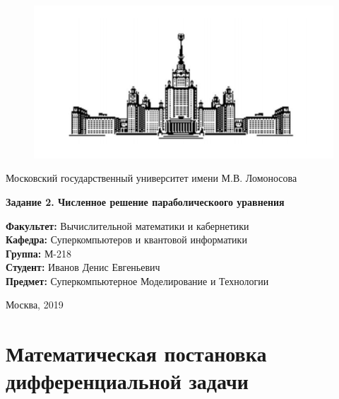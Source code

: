 \documentclass[12pt,a4paper]{scrartcl}
\begin{document}
\begin{titlepage}

    \begin{figure}[h]
        \centering
        \includegraphics[scale=0.5]{gzlogo_new.png}
    \end{figure}

    \begin{center}
        \large
        Московский государственный университет имени М.В. Ломоносова

        \vfill

        \LARGE
        \textbf{Задание 2. Численное решение параболическоого уравнения}

        \vfill

        \hfill\begin{minipage}{0.6\textwidth}
            \normalsize
            \textbf{Факультет:} Вычислительной математики и кабернетики \\
            \textbf{Кафедра:} Суперкомпьютеров и квантовой информатики \\
            \textbf{Группа:} М-218 \\
            \textbf{Студент:} Иванов Денис Евгеньевич \\
            \textbf{Предмет:} Суперкомпьютерное Моделирование и Технологии \\
        \end{minipage}
        \vfill
        

    \end{center}

    \begin{center}
        \large
        Москва, 2019
    \end{center}
\end{titlepage}

\section{Математическая постановка дифференциальной задачи}
\end{document}
